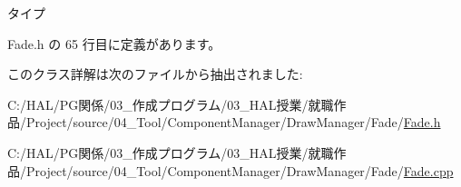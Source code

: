 タイプ 



 Fade.\+h の 65 行目に定義があります。



このクラス詳解は次のファイルから抽出されました\+:\begin{DoxyCompactItemize}
\item 
C\+:/\+H\+A\+L/\+P\+G関係/03\+\_\+作成プログラム/03\+\_\+\+H\+A\+L授業/就職作品/\+Project/source/04\+\_\+\+Tool/\+Component\+Manager/\+Draw\+Manager/\+Fade/\mbox{\hyperlink{_fade_8h}{Fade.\+h}}\item 
C\+:/\+H\+A\+L/\+P\+G関係/03\+\_\+作成プログラム/03\+\_\+\+H\+A\+L授業/就職作品/\+Project/source/04\+\_\+\+Tool/\+Component\+Manager/\+Draw\+Manager/\+Fade/\mbox{\hyperlink{_fade_8cpp}{Fade.\+cpp}}\end{DoxyCompactItemize}
